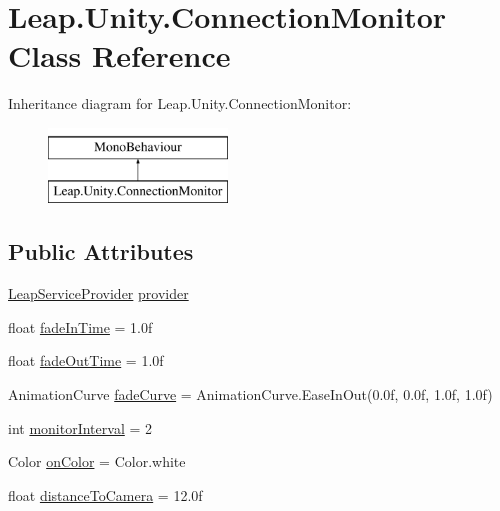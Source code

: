 \hypertarget{class_leap_1_1_unity_1_1_connection_monitor}{}\section{Leap.\+Unity.\+Connection\+Monitor Class Reference}
\label{class_leap_1_1_unity_1_1_connection_monitor}
Inheritance diagram for Leap.\+Unity.\+Connection\+Monitor\+:\begin{figure}[H]
\begin{center}
\leavevmode
\includegraphics[height=2.000000cm]{class_leap_1_1_unity_1_1_connection_monitor}
\end{center}
\end{figure}
\subsection*{Public Attributes}
\begin{DoxyCompactItemize}
\item 
\mbox{\hyperlink{class_leap_1_1_unity_1_1_leap_service_provider}{Leap\+Service\+Provider}} \mbox{\hyperlink{class_leap_1_1_unity_1_1_connection_monitor_ab14509887e80bba36c5b110551f6f555}{provider}}
\item 
float \mbox{\hyperlink{class_leap_1_1_unity_1_1_connection_monitor_ab0456d6fd5e3cd3f1d41b462e79f1f9e}{fade\+In\+Time}} = 1.\+0f
\item 
float \mbox{\hyperlink{class_leap_1_1_unity_1_1_connection_monitor_aa106da52c78dc876d9bbf013ba8408e6}{fade\+Out\+Time}} = 1.\+0f
\item 
Animation\+Curve \mbox{\hyperlink{class_leap_1_1_unity_1_1_connection_monitor_aa129df8f4e78c2d5700608370f0d27d1}{fade\+Curve}} = Animation\+Curve.\+Ease\+In\+Out(0.\+0f, 0.\+0f, 1.\+0f, 1.\+0f)
\item 
int \mbox{\hyperlink{class_leap_1_1_unity_1_1_connection_monitor_a2dabfd9365f0b93c5c9e2939066d6146}{monitor\+Interval}} = 2
\item 
Color \mbox{\hyperlink{class_leap_1_1_unity_1_1_connection_monitor_a685d929118dcc2b6261472e3f684e68a}{on\+Color}} = Color.\+white
\item 
float \mbox{\hyperlink{class_leap_1_1_unity_1_1_connection_monitor_a27395c8e84ea84e79eef408e0581ef34}{distance\+To\+Camera}} = 12.\+0f
\end{DoxyCompactItemize}


